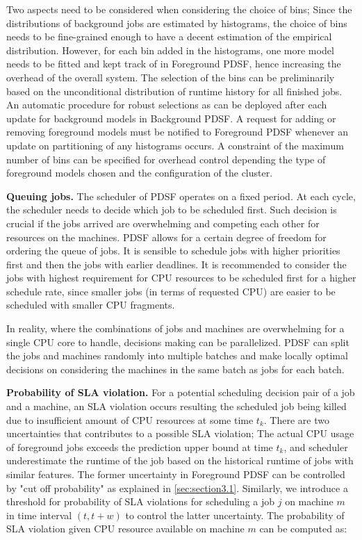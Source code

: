 \documentclass[sigplan,10pt,review,anonymous]{acmart}
\begin{document}
Two aspects need to be considered when considering the choice of bins; Since the distributions of background jobs are estimated by histograms, the choice of bins needs to be fine-grained enough to have a decent estimation of the empirical distribution. However, for each bin added in the histograms, one more model needs to be fitted and kept track of in Foreground PDSF, hence increasing the overhead of the overall system. The selection of the bins can be preliminarily based on the unconditional distribution of runtime history for all finished jobs. An automatic procedure for robust selections as \cite{Freedman1981} can be deployed after each update for background models in Background PDSF. A request for adding or removing foreground models must be notified to Foreground PDSF whenever an update on partitioning of any histograms occurs. A constraint of the maximum number of bins can be specified for overhead control depending the type of foreground models chosen and the configuration of the cluster.

\textbf{Queuing jobs.} The scheduler of PDSF operates on a fixed period. At each cycle, the scheduler needs to decide which job to be scheduled first. Such decision is crucial if the jobs arrived are overwhelming and competing each other for resources on the machines. PDSF allows for a certain degree of freedom for ordering the queue of jobs. It is sensible to schedule jobs with higher priorities first and then the jobs with earlier deadlines. It is recommended to consider the jobs with highest requirement for CPU resources to be scheduled first for a higher schedule rate, since smaller jobs (in terms of requested CPU) are easier to be scheduled with smaller CPU fragments.

In reality, where the combinations of jobs and machines are overwhelming for a single CPU core to handle, decisions making can be parallelized. PDSF can split the jobs and machines randomly into multiple batches and make locally optimal decisions on considering the machines in the same batch as jobs for each batch. 

\textbf{Probability of SLA violation.} For a potential scheduling decision pair of a job and a machine, an SLA violation occurs resulting the scheduled job being killed due to insufficient amount of CPU resources at some time $t_k$. There are two uncertainties that contributes to a possible SLA violation; The actual CPU usage of foreground jobs exceeds the prediction upper bound at time $t_k$, and scheduler underestimate the runtime of the job based on the historical runtime of jobs with similar features. The former uncertainty in Foreground PDSF can be controlled by "cut off probability" as explained in \cref{sec:section3.1}. Similarly, we introduce a threshold for probability of SLA violations for scheduling a job $j$ on machine $m$ in time interval $(t, t + w)$ to control the latter uncertainty. The probability of SLA violation given CPU resource available on machine $m$ can be computed as:
\end{document}
